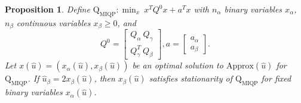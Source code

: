 \documentclass[]{article}
\newtheorem{proposition}{Proposition}
\begin{document}
\begin{proposition}\label{prop:fixed-point}
    Define $\mathrm{Q}_{\mathrm{MIQP}}:\min_x\ x^TQ^0x + a^Tx$ with $n_\alpha$ binary variables $x_\alpha$, $n_\beta$ continuous variables $x_\beta \geq 0$, and
    \[Q^0=\begin{bmatrix}
            Q_\alpha\ Q_\gamma \\
            Q_\gamma^T\ Q_\beta
        \end{bmatrix}, a = \begin{bmatrix}
            a_\alpha\\
            a_\beta
        \end{bmatrix}.\]
    Let $x(\hat{u})=(x_\alpha(\hat{u}), x_\beta(\hat{u}))$ be an optimal solution to $\mathrm{Approx}(\hat{u})$ for $\mathrm{Q}_{\mathrm{MIQP}}$. If $\hat{u}_\beta=2x_\beta(\hat{u})$, then $x_\beta(\hat{u})$ satisfies stationarity of $\mathrm{Q}_{\mathrm{MIQP}}$ for fixed binary variables $x_\alpha(\hat{u})$.
\end{proposition}
\end{document}
